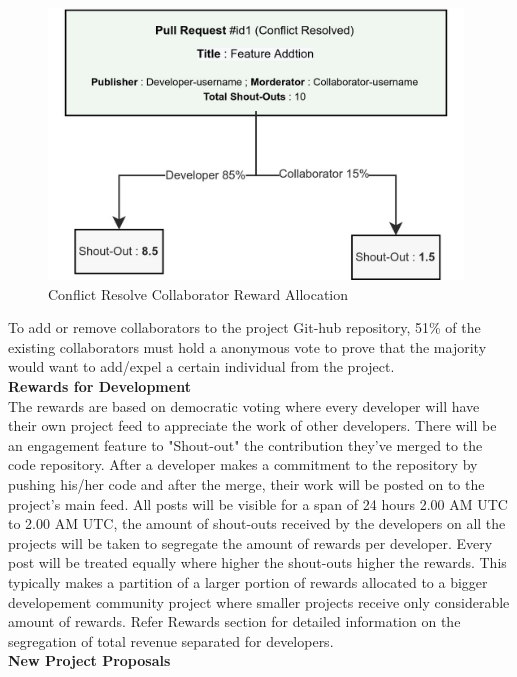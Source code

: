 \documentclass[10pt]{article}
\begin{document}
\begin{figure}[H]
\begin{center}
\includegraphics[width=11cm]{dev-reward-distribution}
\caption{Conflict Resolve Collaborator Reward Allocation}
\end{center}
\end{figure}

To add or remove collaborators to the project Git-hub repository, 51\% of the existing collaborators must hold a anonymous vote to prove that the majority would want to add/expel a certain individual from the project.\\
 
\textbf{Rewards for Development}\\

The rewards are based on democratic voting where every developer will have their own project feed to appreciate the work of other developers. There will be an engagement feature to "Shout-out" the contribution they've merged to the code repository. After a developer makes a commitment to the repository by pushing his/her code and after the merge, their work will be posted on to the project's main feed. All posts will be visible for a span of 24 hours 2.00 AM UTC to 2.00 AM UTC, the amount of shout-outs received by the developers on all the projects will be taken to segregate the amount of rewards per developer. Every post will be treated equally where higher the shout-outs higher the rewards. This typically makes a partition of a larger portion of rewards allocated to a bigger developement community project where smaller projects receive only considerable amount of rewards. Refer Rewards section for detailed information on the segregation of total revenue separated for developers.\\


\textbf{New Project Proposals}\\
\end{document}
